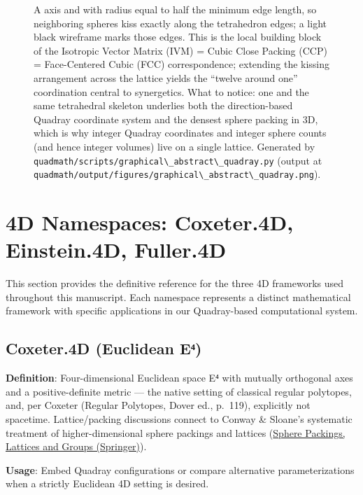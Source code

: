 \documentclass[
  10pt,
]{article}
\newcommand{\passthrough}[1]{#1}
\begin{document}
\begin{figure}
{A axis and with radius equal to half the minimum edge length, so
neighboring spheres kiss exactly along the tetrahedron edges; a light
black wireframe marks those edges. This is the local building block of
the Isotropic Vector Matrix (IVM) = Cubic Close Packing (CCP) =
Face-Centered Cubic (FCC) correspondence; extending the kissing
arrangement across the lattice yields the ``twelve around one''
coordination central to synergetics. What to notice: one and the same
tetrahedral skeleton underlies both the direction-based Quadray
coordinate system and the densest sphere packing in 3D, which is why
integer Quadray coordinates and integer sphere counts (and hence integer
volumes) live on a single lattice. Generated by
\protect\passthrough{\lstinline!quadmath/scripts/graphical\_abstract\_quadray.py!}
(output at
\protect\passthrough{\lstinline!quadmath/output/figures/graphical\_abstract\_quadray.png!}).}
\end{figure}

\newpage

\section{4D Namespaces: Coxeter.4D, Einstein.4D,
Fuller.4D}\label{d-namespaces-coxeter.4d-einstein.4d-fuller.4d}

This section provides the definitive reference for the three 4D
frameworks used throughout this manuscript. Each namespace represents a
distinct mathematical framework with specific applications in our
Quadray-based computational system.

\subsection{Coxeter.4D (Euclidean
E⁴)}\label{coxeter.4d-euclidean-eux2074}

\textbf{Definition}: Four-dimensional Euclidean space E⁴ with mutually
orthogonal axes and a positive-definite metric --- the native setting of
classical regular polytopes, and, per Coxeter (Regular Polytopes, Dover
ed., p.~119), explicitly not spacetime. Lattice/packing discussions
connect to Conway \& Sloane's systematic treatment of higher-dimensional
sphere packings and lattices
(\href{https://link.springer.com/book/10.1007/978-1-4757-6568-7}{Sphere
Packings, Lattices and Groups (Springer)}).

\textbf{Usage}: Embed Quadray configurations or compare alternative
parameterizations when a strictly Euclidean 4D setting is desired.
\end{document}
